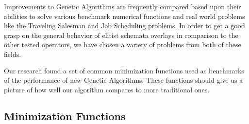 Improvements to Genetic Algorithms are frequently compared based upon their abilities to solve various benchmark numerical functions and real world problems like the Traveling Salesman and Job Scheduling problems\cite{molga05}. In order to get a good grasp on the general behavior of elitist schemata overlays in comparison to the other tested operators, we have chosen a variety of problems from both of these fields. 

Our research found a set of common minimization functions used as benchmarks of the performance of new Genetic Algorithms\cite{Deb99,Eiben95,Tsutsui99}. These functions should give us a picture of how well our algorithm compares to more traditional ones. 

\subsection*{Minimization Functions}

